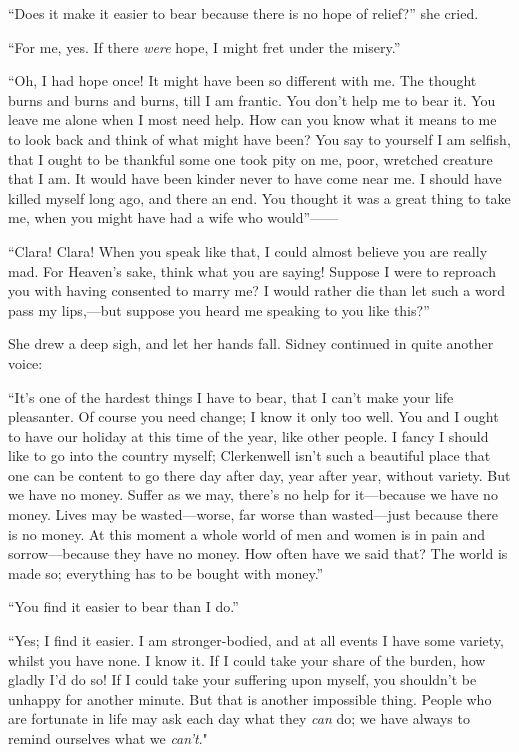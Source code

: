 ``Does it make it easier to bear because there is no hope of relief?''
she cried.

``For me, yes. If there \emph{were} hope, I might fret under the
misery.''

``Oh, I had hope once! It might have been so different with me. The
thought burns and burns and burns, till I am frantic. You don't help me
to bear it. You leave me alone when I most need help. How can you know
what it means to me to look back and think of what might have been? You
say to yourself I am selfish, that I ought to be thankful some one took
pity on me, poor, wretched creature that I am. It would have been kinder
never to have come near me. I should have killed myself long ago, and
there an end. You thought it was a great thing to take me, when you
might have had a wife who would''{{------}}

``Clara! Clara! When you speak like that, {}I could almost believe you
are really mad. For Heaven's sake, think what you are saying! Suppose I
were to reproach you with having consented to marry me? I would rather
die than let such a word pass my lips,---but suppose you heard me
speaking to you like this?''

She drew a deep sigh, and let her hands fall. Sidney continued in quite
another voice:

``It's one of the hardest things I have to bear, that I can't make your
life pleasanter. Of course you need change; I know it only too well. You
and I ought to have our holiday at this time of the year, like other
people. I fancy I should like to go into the country myself; Clerkenwell
isn't such a beautiful place that one can be content to go there day
after day, year after year, without variety. But we have no money.
Suffer as we may, there's no help for it---because we have no money.
Lives may be wasted---worse, far worse than wasted---just because there
is no money. At this moment a whole world of men and women is in pain
and sorrow---because they have no money. How often have we said that?
The world is made so; everything has to be bought with money.''

{}``You find it easier to bear than I do.''

``Yes; I find it easier. I am stronger-bodied, and at all events I have
some variety, whilst you have none. I know it. If I could take your
share of the burden, how gladly I'd do so! If I could take your
suffering upon myself, you shouldn't be unhappy for another minute. But
that is another impossible thing. People who are fortunate in life may
ask each day what they \emph{can} do; we have always to remind ourselves
what we \emph{can't}."

